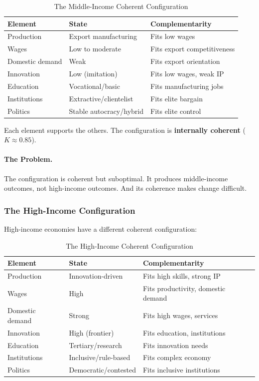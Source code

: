 \begin{table}[htbp]
\centering
\caption{The Middle-Income Coherent Configuration}
\label{tab:mi-config}
\begin{tabular}{@{}lll@{}}
\toprule
\textbf{Element} & \textbf{State} & \textbf{Complementarity} \\
\midrule
Production & Export manufacturing & Fits low wages \\
Wages & Low to moderate & Fits export competitiveness \\
Domestic demand & Weak & Fits export orientation \\
Innovation & Low (imitation) & Fits low wages, weak IP \\
Education & Vocational/basic & Fits manufacturing jobs \\
Institutions & Extractive/clientelist & Fits elite bargain \\
Politics & Stable autocracy/hybrid & Fits elite control \\
\bottomrule
\end{tabular}
\end{table}

Each element supports the others. The configuration is \textbf{internally coherent} ($K \approx 0.85$).

\paragraph{The Problem.}
The configuration is coherent but suboptimal. It produces middle-income 
outcomes, not high-income outcomes. And its coherence makes change difficult.

\subsubsection{The High-Income Configuration}

High-income economies have a different coherent configuration:

\begin{table}[htbp]
\centering
\caption{The High-Income Coherent Configuration}
\label{tab:hi-config}
\begin{tabular}{@{}lll@{}}
\toprule
\textbf{Element} & \textbf{State} & \textbf{Complementarity} \\
\midrule
Production & Innovation-driven & Fits high skills, strong IP \\
Wages & High & Fits productivity, domestic demand \\
Domestic demand & Strong & Fits high wages, services \\
Innovation & High (frontier) & Fits education, institutions \\
Education & Tertiary/research & Fits innovation needs \\
Institutions & Inclusive/rule-based & Fits complex economy \\
Politics & Democratic/contested & Fits inclusive institutions \\
\bottomrule
\end{tabular}
\end{table}

